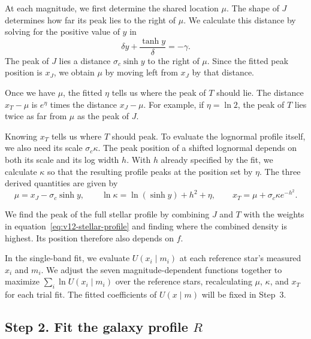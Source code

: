 At each magnitude, we first determine the shared location \(\mu\).
The shape of \(J\) determines how far its peak lies to the right
of \(\mu\). We calculate this distance by solving for the positive
value of \(y\) in
\begin{equation}
 \delta y+\frac{\tanh y}{\delta}=-\gamma .
\end{equation}
The peak of \(J\) lies a distance \(\sigma_c\sinh y\) to the right
of \(\mu\). Since the fitted peak position is \(x_J\), we obtain
\(\mu\) by moving left from \(x_J\) by that distance.

Once we have \(\mu\), the fitted \(\eta\) tells us where the peak of
\(T\) should lie. The distance \(x_T-\mu\) is \(e^\eta\) times the
distance \(x_J-\mu\). For example, if \(\eta=\ln 2\), the peak of
\(T\) lies twice as far from \(\mu\) as the peak of \(J\).

Knowing \(x_T\) tells us where \(T\) should peak. To evaluate the
lognormal profile itself, we also need its scale
\(\sigma_c\kappa\). The peak position of a shifted lognormal depends
on both its scale and its log width \(h\). With \(h\) already
specified by the fit, we calculate \(\kappa\) so that the resulting
profile peaks at the position set by \(\eta\). The three derived
quantities are given by
\begin{equation}
 \mu=x_J-\sigma_c\sinh y,\qquad
 \ln\kappa=\ln(\sinh y)+h^2+\eta,\qquad
 x_T=\mu+\sigma_c\kappa e^{-h^2}.
 \label{eq:v12-stellar-derived}
\end{equation}

We find the peak of the full stellar profile by combining \(J\) and
\(T\) with the weights in equation~\eqref{eq:v12-stellar-profile} and
finding where the combined density is highest. Its position therefore
also depends on \(f\).

In the single-band fit, we evaluate \(U(x_i\mid m_i)\) at each
reference star's measured \(x_i\) and \(m_i\). We adjust the seven
magnitude-dependent functions together to maximize
\(\sum_i\ln U(x_i\mid m_i)\) over the reference stars, recalculating
\(\mu\), \(\kappa\), and \(x_T\) for each trial fit. The fitted coefficients of \(U(x\mid m)\) will be fixed in Step~3.

\subsection{Step 2. Fit the galaxy profile \texorpdfstring{\(R\)}{R}}

